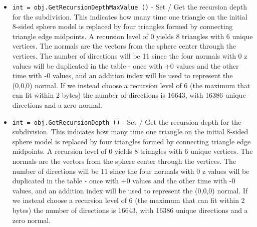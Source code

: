 \begin{itemize}
\item  \verb|int = obj.GetRecursionDepthMaxValue ()| -  Set / Get the recursion depth for the subdivision. This
 indicates how many time one triangle on the initial 8-sided
 sphere model is replaced by four triangles formed by connecting
 triangle edge midpoints. A recursion level of 0 yields 8 triangles
 with 6 unique vertices. The normals are the vectors from the
 sphere center through the vertices. The number of directions
 will be 11 since the four normals with 0 z values will be
 duplicated in the table - once with +0 values and the other
 time with -0 values, and an addition index will be used to
 represent the (0,0,0) normal. If we instead choose a recursion 
 level of 6 (the maximum that can fit within 2 bytes) the number
 of directions is 16643, with 16386 unique directions and a 
 zero normal.

\item  \verb|int = obj.GetRecursionDepth ()| -  Set / Get the recursion depth for the subdivision. This
 indicates how many time one triangle on the initial 8-sided
 sphere model is replaced by four triangles formed by connecting
 triangle edge midpoints. A recursion level of 0 yields 8 triangles
 with 6 unique vertices. The normals are the vectors from the
 sphere center through the vertices. The number of directions
 will be 11 since the four normals with 0 z values will be
 duplicated in the table - once with +0 values and the other
 time with -0 values, and an addition index will be used to
 represent the (0,0,0) normal. If we instead choose a recursion 
 level of 6 (the maximum that can fit within 2 bytes) the number
 of directions is 16643, with 16386 unique directions and a 
 zero normal.

\end{itemize}
